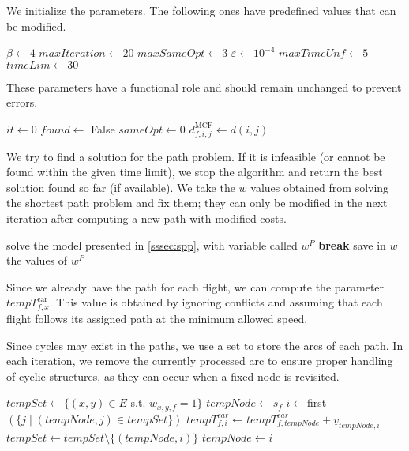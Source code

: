 \documentclass[../thesis.tex]{subfiles}
\begin{document}
We initialize the parameters. The following ones have predefined values that can be modified.\begin{algorithm}[H]
\begin{algorithmic}
\STATE $\beta\gets 4$
\STATE $maxIteration\gets 20$
\STATE $maxSameOpt\gets 3$
\STATE $\varepsilon\gets 10^{-4}$
\STATE $maxTimeUnf\gets 5$
\STATE $timeLim\gets 30$
\end{algorithmic}
\end{algorithm}
These parameters have a functional role and should remain unchanged to prevent errors.
\begin{algorithm}[H]
\begin{algorithmic}
\STATE $it\gets 0$
\STATE $found\gets$ False
\STATE $sameOpt\gets 0$
    \STATE $d^\text{MCF}_{f,i,j}\gets d(i,j)$
\ENDFOR
{}
\end{algorithmic}
\end{algorithm}

We try to find a solution for the path problem. If it is infeasible (or cannot be found within the given time limit), we stop the algorithm and return the best solution found so far (if available).
We take the $w$ values obtained from solving the shortest path problem and fix them; they can only be modified in the next iteration after computing a new path with modified costs.

\begin{algorithm}[H]
\begin{algorithmic}
    \STATE solve the model presented in \ref{sssec:spp}, with variable called $w^P$
        \STATE \textbf{break}
    \ENDIF
    \STATE save in $w$ the values of $w^P$
\end{algorithmic}
\end{algorithm}

Since we already have the path for each flight, we can compute the parameter $tempT^\text{ear}_{f,x}$. This value is obtained by ignoring conflicts and assuming that each flight follows its assigned path at the minimum allowed speed.

Since cycles may exist in the paths, we use a set to store the arcs of each path. In each iteration, we remove the currently processed arc to ensure proper handling of cyclic structures, as they can occur when a fixed node is revisited.

\begin{algorithm}[H]
\begin{algorithmic}
    \STATE $tempSet\gets \{(x,y)\in E$ s.t. $w_{x,y,f}=1\}$
    \STATE $tempNode\gets s_f$
    \STATE $i\gets $first$(\{ j \mid (tempNode, j) \in tempSet \})$
    \STATE $tempT^{ear}_{f,i}\gets tempT^{ear}_{f,tempNode}+\underline v_{tempNode,i}$
    \STATE $tempSet\gets tempSet\setminus\{(tempNode,i)\}$
    \STATE $tempNode\gets i$
    \ENDWHILE
    \ENDFOR
\end{algorithmic}
\end{algorithm}
\end{document}

